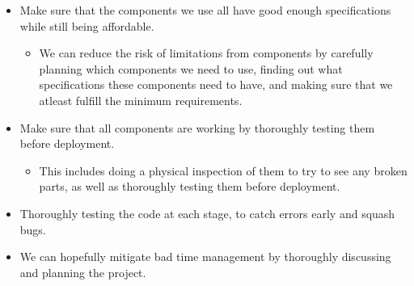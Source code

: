 \documentclass[11pt]{article}
\begin{document}
\begin{itemize}
    \item Make sure that the components we use all have good enough specifications while still being affordable. \begin{itemize}
        \item We can reduce the risk of limitations from components by carefully planning which components we need to use, finding out what specifications these components need to have, and making sure that we atleast fulfill the minimum requirements. 
    \end{itemize}
    \item Make sure that all components are working by thoroughly testing them before deployment. \begin{itemize}
        \item This includes doing a physical inspection of them to try to see any broken parts, as well as thoroughly testing them before deployment. 
    \end{itemize}
    \item Thoroughly testing the code at each stage, to catch errors early and squash bugs. 
    \item We can hopefully mitigate bad time management by thoroughly discussing and planning the project. 
\end{itemize}
\end{document}

